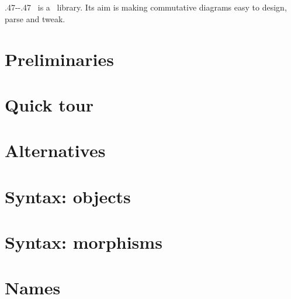 




\thispagestyle{empty}
\noindent
{}\\[0.62em]
\\[1.62em]
\par
\vfill
{}


\newpage
\begin{adjustwidth}{.47\textwidth-\marginparwidth-\marginparsep}{.47\textwidth}
\noindent\koDi\ is a \TikZ\ library. Its aim is\linebreak
making commutative diagrams\linebreak
easy to design, parse and tweak.\par
\end{adjustwidth}

\newpage
\section{Preliminaries}

\newpage
\section{Quick tour}

\newpage
\section{Alternatives}

\newpage
\section{Syntax: objects}

\newpage
\section{Syntax: morphisms}

\newpage
\section{Names}

\newpage
